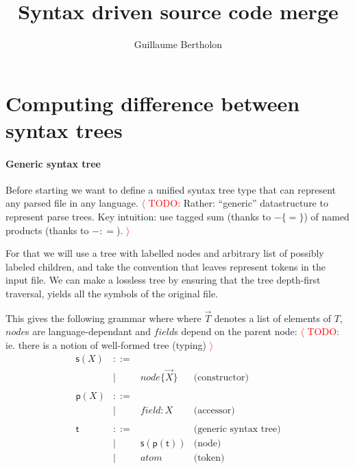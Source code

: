 \documentclass[a4paper,11pt]{article}
\title{Syntax driven source code merge}
\author{Guillaume Bertholon}
\renewcommand\vec[1]{\overrightarrow{#1}}
\begin{document}
\maketitle

\newcommand{\TODO}[1]{\textcolor{red}{$\langle$ TODO:} #1 \textcolor{red}{$\rangle$}}


\newcommand{\aNode}{\ensuremath{\mathit{node}}}
\newcommand{\aField}{\ensuremath{\mathit{field}}}
\newcommand{\aAtom}{\ensuremath{\mathit{atom}}}
\newcommand{\aTree}{\ensuremath{\mathsf{t}}}
\newcommand{\aSum}{\ensuremath{\mathsf{s}}}
\newcommand{\aProd}{\ensuremath{\mathsf{p}}}
\newcommand{\many}[1]{\ensuremath{\overrightarrow{#1}}}

\newcommand{\defNode}[2]{\ensuremath{#1 \{ #2 \}}}
\newcommand{\defField}[2]{\ensuremath{#1\!: #2}}



\section{Computing difference between syntax trees}

\paragraph{Generic syntax tree}
Before starting we want to define a unified syntax tree type that can
represent any parsed file in any language. \TODO{Rather: ``generic''
  datastructure to represent parse trees. Key intuition: use tagged
  sum (thanks to \defNode{-}{=}) of named products (thanks to
  \defField{-}{=}).}

For that we will use a tree with labelled
nodes and arbitrary list of possibly labeled children, and take the convention
that leaves represent tokens in the input file. We can make a lossless tree by
ensuring that the tree depth-first traversal, yields all the symbols of the
original file.

This gives the following grammar where where $\vec{T}$ denotes a list of
elements of $T$, $node$s are language-dependant and $field$s depend on the
parent node: \TODO{ie. there is a notion of well-formed tree (typing)}
%
\[\begin{array}{lcll}
\aSum(X)  & ::= & & \\
          & |   & \defNode{\aNode}{\many{X}} & \text{(constructor)} \\
\\
\aProd(X) & ::= & & \\
          & |   & \defField{\aField}{X} & \text{(accessor)} \\
\\
\aTree & ::= & & \text{(generic syntax tree)} \\
       &  |  & \aSum(\aProd(\aTree)) & \text{(node)} \\
       &  |  & \aAtom & \text{(token)}
\end{array}\]
\end{document}
